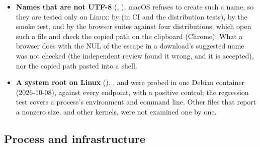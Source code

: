 \begin{itemize}
  \item \textbf{Names that are not UTF-8} (, ).  macOS refuses to
        create such a name, so they are tested only on Linux: by
         (in CI and the distribution tests), by the
        smoke test, and by the browser suites against four distributions, which open such
        a file and check the copied path on the clipboard (Chrome).  What a browser does
        with the NUL of the escape in a download's suggested name was not checked (the
        independent review found it wrong, and it is accepted), nor the copied path pasted
        into a shell.
  \item \textbf{A system root on Linux} ().  ,  and
         were probed in one Debian container (2026-10-08), against every
        endpoint, with a positive control; the regression test covers a process's
        environment and command line.  Other  files that report a nonzero
        size, and other kernels, were not examined one by one.
\end{itemize}

\subsection{Process and infrastructure}

